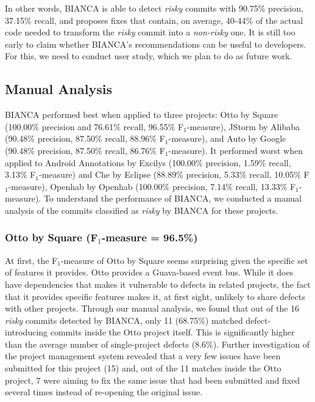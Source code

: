 \documentclass[conference]{IEEEtran}
\begin{document}
In other words, BIANCA is able to detect \emph{risky} commits with
90.75\% precision, 37.15\% recall, and proposes fixes that contain, on
average, 40-44\% of the actual code needed to transform the \emph{risky}
commit into a \emph{non-risky} one. It is still too early to claim
whether BIANCA's recommendations can be useful to developers. For this,
we need to conduct user study, which we plan to do as future work.

\subsection{Manual Analysis}\label{manual-analysis}

BIANCA performed best when applied to three projects: Otto by Square
(100.00\% precision and 76.61\% recall, 96.55\% F$_1$-measure), JStorm
by Alibaba (90.48\% precision, 87.50\% recall, 88.96\% F$_1$-measure),
and Auto by Google (90.48\% precision, 87.50\% recall, 86.76\%
F$_1$-measure). It performed worst when applied to Android Annotations
by Excilys (100.00\% precision, 1.59\% recall, 3.13\% F$_1$-measure) and
Che by Eclipse (88.89\% precision, 5.33\% recall, 10.05\%
F$_1$-measure), Openhab by Openhab (100.00\% precision, 7.14\% recall,
13.33\% F$_1$-measure). To understand the performance of BIANCA, we
conducted a manual analysis of the commits classified as \emph{risky} by
BIANCA for these projects.

\subsubsection{Otto by Square (F$_1$-measure =
96.5\%)}\label{otto-by-square-fux5f1-measure-96.5}

At first, the F$_1$-measure of Otto by Square seems surprising given the
specific set of features it provides. Otto provides a Guava-based event
bus. While it does have dependencies that makes it vulnerable to defects
in related projects, the fact that it provides specific features makes
it, at first sight, unlikely to share defects with other projects.
Through our manual analysis, we found that out of the 16 \emph{risky}
commits detected by BIANCA, only 11 (68.75\%) matched defect-introducing
commits inside the Otto project itself. This is significantly higher
than the average number of single-project defects (8.6\%). Further
investigation of the project management system revealed that a very few
issues have been submitted for this project (15) and, out of the 11
matches inside the Otto project, 7 were aiming to fix the same issue
that had been submitted and fixed several times instead of re-opening
the original issue.
\end{document}

